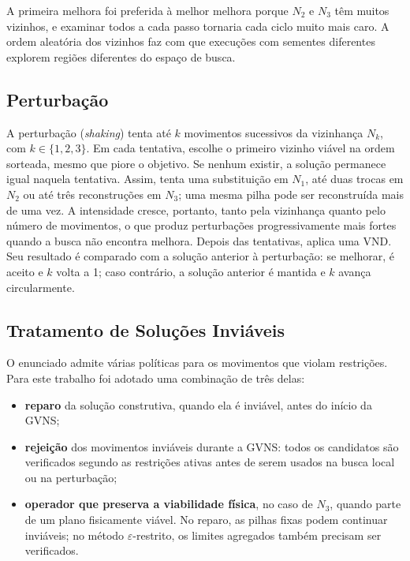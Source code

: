 \documentclass[conference]{IEEEtran}
\begin{document}
A primeira melhora foi preferida à melhor melhora porque $N_2$ e $N_3$ têm muitos vizinhos, e examinar todos a cada passo tornaria cada ciclo muito mais caro. A ordem aleatória dos vizinhos faz com que execuções com sementes diferentes explorem regiões diferentes do espaço de busca.

\subsection{Perturbação}

A perturbação (\textit{shaking}) tenta até $k$ movimentos sucessivos da vizinhança $N_k$, com $k \in \{1,2,3\}$. Em cada tentativa, escolhe o primeiro vizinho viável na ordem sorteada, mesmo que piore o objetivo. Se nenhum existir, a solução permanece igual naquela tentativa. Assim, tenta uma substituição em $N_1$, até duas trocas em $N_2$ ou até três reconstruções em $N_3$; uma mesma pilha pode ser reconstruída mais de uma vez. A intensidade cresce, portanto, tanto pela vizinhança quanto pelo número de movimentos, o que produz perturbações progressivamente mais fortes quando a busca não encontra melhora. Depois das tentativas, aplica uma VND. Seu resultado é comparado com a solução anterior à perturbação: se melhorar, é aceito e $k$ volta a 1; caso contrário, a solução anterior é mantida e $k$ avança circularmente.

\subsection{Tratamento de Soluções Inviáveis}

O enunciado admite várias políticas para os movimentos que violam restrições. Para este trabalho foi adotado uma combinação de três delas:
\begin{itemize}
    \item \textbf{reparo} da solução construtiva, quando ela é inviável, antes do início da GVNS;
    \item \textbf{rejeição} dos movimentos inviáveis durante a GVNS: todos os candidatos são verificados segundo as restrições ativas antes de serem usados na busca local ou na perturbação;
    \item \textbf{operador que preserva a viabilidade física}, no caso de $N_3$, quando parte de um plano fisicamente viável. No reparo, as pilhas fixas podem continuar inviáveis; no método $\varepsilon$-restrito, os limites agregados também precisam ser verificados.
\end{itemize}
\end{document}
